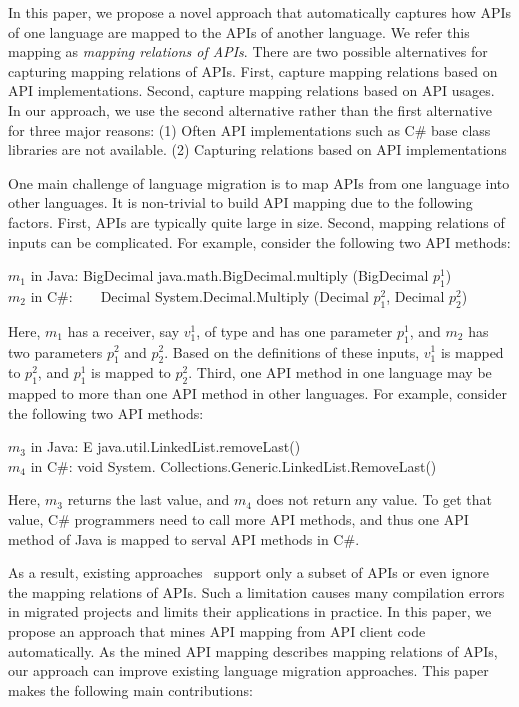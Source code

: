 In this paper, we propose a novel approach that automatically captures
how APIs of one language are mapped to the APIs of another language. We refer this
mapping as \emph{mapping relations of APIs}. There are two possible alternatives
for capturing mapping relations of APIs. First, capture mapping relations based
on API implementations. Second, capture mapping relations based on API usages.
In our approach, we use the second alternative rather than the first alternative 
for three major reasons: (1) Often API implementations such as C\# base class 
libraries are not available. (2) Capturing relations based on API implementations


One main challenge of language migration is to map APIs from one
language into other languages. It is non-trivial to build API
mapping due to the following factors. First, APIs are typically
quite large in size. Second, mapping relations of inputs can be
complicated. For example, consider the following two API methods:

\begin{CodeOut}
$m_1$ in Java: BigDecimal java.math.BigDecimal.multiply (BigDecimal $p_1^1$)\\
\hspace*{0.11in}$m_2$ in C\#:\ \ \ \  Decimal
System.Decimal.Multiply (Decimal $p_1^2$, Decimal $p_2^2$)
\end{CodeOut}

Here, $m_1$ has a receiver, say $v_1^1$, of type 
and has one parameter $p_1^1$, and $m_2$ has two parameters $p_1^2$
and $p_2^2$. Based on the definitions of these inputs, $v_1^1$ is
mapped to $p_1^2$, and $p_1^1$ is mapped to $p_2^2$. Third, one API
method in one language may be mapped to more than one API method in
other languages. For example, consider the following two API
methods:

\begin{CodeOut}
$m_3$ in Java: E java.util.LinkedList.removeLast()\\
\hspace*{0.11in}$m_4$ in C\#: void System.
Collections.Generic.LinkedList.RemoveLast()
\end{CodeOut}

Here, $m_3$ returns the last value, and $m_4$ does not return any
value. To get that value, C\# programmers need to call more API
methods, and thus one API method of Java is mapped to serval API
methods in C\#.


As a result, existing
approaches~\cite{mossienko2003automated,yasumatsu1995spice,hainaut2008migration}
support only a subset of APIs or even ignore the mapping relations
of APIs. Such a limitation causes many compilation errors in
migrated projects and limits their applications in practice. In this
paper, we propose an approach that mines API mapping from API client
code automatically. As the mined API mapping describes mapping
relations of APIs, our approach can improve existing language
migration approaches. This paper makes the following main
contributions:

